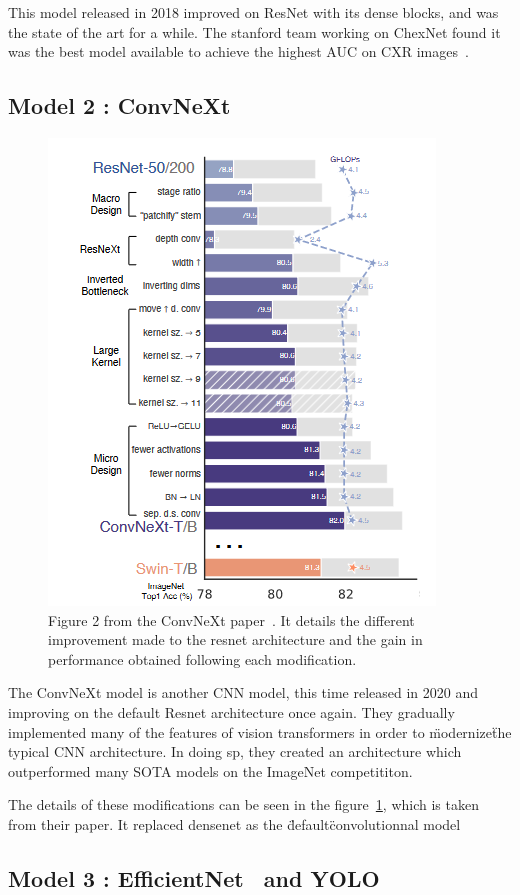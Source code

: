 \documentclass[11pt]{article}
\begin{document}
        This model released in 2018 improved on ResNet with its dense blocks, and was the state of the art for a while. The stanford team working on ChexNet found it was the best model available to achieve the highest AUC on CXR images~\cite{chexnet}.


    \subsection{Model 2 : ConvNeXt~\cite{convnext}}


\begin{figure}[H]

     \centering
     \includegraphics[width=0.5 \textwidth]{plots/convnext_graph}
     \caption{Figure 2 from the ConvNeXt paper~\cite{convnext}. It details the different improvement made to the
     resnet architecture and the gain in performance obtained following each modification.}
     \label{fig:convnext}

\end{figure}

        The ConvNeXt model is another CNN model, this time released in 2020 and improving on the default Resnet architecture once again.
        They gradually implemented many of the features of vision transformers in order to \"modernize\" the typical
    CNN architecture. In doing sp,
        they created an architecture which outperformed many SOTA models on the ImageNet competititon.

        The details of these modifications can be seen in the figure~\ref{fig:convnext}, which is taken from their paper.
        It replaced densenet as the \"default\" convolutionnal model


    \subsection{Model 3 : EfficientNet~\cite{efficientnet} and YOLO~\cite{yolo}}
\end{document}
